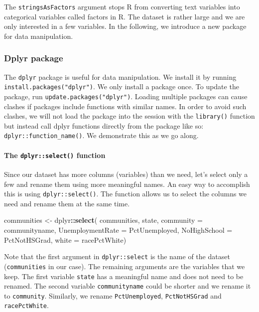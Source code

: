 \documentclass[]{article}
\newenvironment{Shaded}{\begin{snugshade}}{\end{snugshade}}
\newcommand{\DataTypeTok}[1]{\textcolor[rgb]{0.13,0.29,0.53}{#1}}
\newcommand{\KeywordTok}[1]{\textcolor[rgb]{0.13,0.29,0.53}{\textbf{#1}}}
\newcommand{\NormalTok}[1]{#1}
\newcommand{\OperatorTok}[1]{\textcolor[rgb]{0.81,0.36,0.00}{\textbf{#1}}}
\newcommand{\StringTok}[1]{\textcolor[rgb]{0.31,0.60,0.02}{#1}}
\let\oldparagraph\paragraph
\renewcommand{\paragraph}[1]{\oldparagraph{#1}\mbox{}}
\begin{document}
The \texttt{stringsAsFactors} argument stops R from converting text variables into categorical variables called factors in R. The dataset is rather large and we are only interested in a few variables. In the following, we introduce a new package for data manipulation.

\hypertarget{dplyr-package}{%
\subsubsection{Dplyr package}\label{dplyr-package}}

The \texttt{dplyr} package is useful for data manipulation. We install it by running \texttt{install.packages("dplyr")}. We only install a package once. To update the package, run \texttt{update.packages("dplyr")}. Loading multiple packages can cause clashes if packages include functions with similar names. In order to avoid such clashes, we will not load the package into the session with the \texttt{library()} function but instead call dplyr functions directly from the package like so: \texttt{dplyr::function\_name()}. We demonstrate this as we go along.

\hypertarget{the-dplyrselect-function}{%
\paragraph{\texorpdfstring{The \texttt{dplyr::select()} function}{The dplyr::select() function}}\label{the-dplyrselect-function}}

Since our dataset has more columns (variables) than we need, let's select only a few and rename them using more meaningful names. An easy way to accomplish this is using \texttt{dplyr::select()}. The function allows us to select the columns we need and rename them at the same time.

\begin{Shaded}
\begin{Highlighting}[]
\NormalTok{communities <-}\StringTok{ }\NormalTok{dplyr}\OperatorTok{::}\KeywordTok{select}\NormalTok{(}
\NormalTok{  communities, }
\NormalTok{  state, }
  \DataTypeTok{community =}\NormalTok{ communityname, }
  \DataTypeTok{UnemploymentRate =}\NormalTok{ PctUnemployed, }
  \DataTypeTok{NoHighSchool =}\NormalTok{ PctNotHSGrad,}
  \DataTypeTok{white =}\NormalTok{ racePctWhite)}
\end{Highlighting}
\end{Shaded}

Note that the first argument in \texttt{dplyr::select} is the name of the dataset (\texttt{communities} in our case). The remaining arguments are the variables that we keep. The first variable \texttt{state} has a meaningful name and does not need to be renamed. The second variable \texttt{communityname} could be shorter and we rename it to \texttt{community}. Similarly, we rename \texttt{PctUnemployed}, \texttt{PctNotHSGrad} and \texttt{racePctWhite}.
\end{document}
